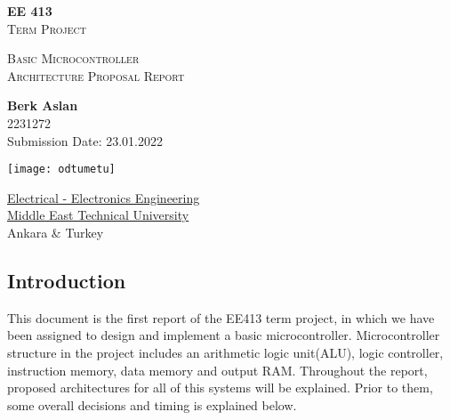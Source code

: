 \documentclass[12pt]{article}
\begin{document}
\begin{titlepage}
\begin{center}


\vspace*{3cm}
\begin{LARGE}
\textbf{EE 413}\\
\vspace{1cm}
\textsc{Term Project}\\
\vspace{1cm}

\begin{Large}
\textsc{Basic Microcontroller \\ \vspace{0.4cm}
Architecture Proposal Report}
\end{Large}
\end{LARGE}
       
\vspace{3cm}

\begin{large}
{\bf Berk Aslan}  \\
2231272 \\
\vspace{1cm}
Submission Date: 23.01.2022 
\end{large}

\vspace{2cm}


\texttt{[image: odtumetu]}
            
\href{https://eee.metu.edu.tr/}{Electrical - Electronics Engineering}\\
\href{https://metu.edu.tr/}{Middle East Technical University}\\
{Ankara \& Turkey}\\

       
\pagestyle{empty}  
\end{center}
\end{titlepage}


\subsection*{Introduction}

This document is the first report of the EE413 term project, in which we have been assigned to design and implement a basic microcontroller. Microcontroller structure in the project includes an arithmetic logic unit(ALU), logic controller, instruction memory, data memory and output RAM. Throughout the report, proposed architectures for all of this systems will be explained. Prior to them, some overall decisions and timing is explained below.
\end{document}
